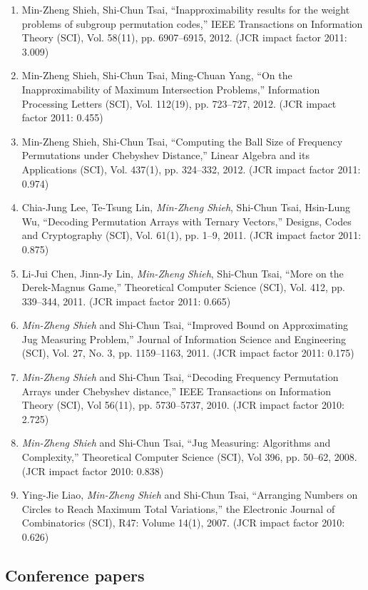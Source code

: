 \documentclass[A4]{article}
\begin{document}
\begin{enumerate}
\item Min-Zheng Shieh, Shi-Chun Tsai, ``Inapproximability results for the weight problems of subgroup permutation codes,'' IEEE Transactions on Information Theory (SCI), Vol. 58(11), pp. 6907--6915, 2012. (JCR impact factor 2011: 3.009)
\item Min-Zheng Shieh, Shi-Chun Tsai, Ming-Chuan Yang, ``On the Inapproximability of Maximum Intersection Problems,'' Information Processing Letters (SCI), Vol. 112(19), pp. 723--727, 2012. (JCR impact factor 2011: 0.455)
\item Min-Zheng Shieh, Shi-Chun Tsai, ``Computing the Ball Size of Frequency Permutations under Chebyshev Distance,'' Linear Algebra and its Applications (SCI), Vol. 437(1), pp. 324--332, 2012. (JCR impact factor 2011: 0.974)
\item Chia-Jung Lee, Te-Tsung Lin, \emph{Min-Zheng Shieh}, Shi-Chun Tsai, Hsin-Lung Wu, ``Decoding Permutation Arrays with Ternary Vectors,'' Designs, Codes and Cryptography (SCI), Vol. 61(1), pp. 1--9, 2011. (JCR impact factor 2011: 0.875)
\item Li-Jui Chen, Jinn-Jy Lin, \emph{Min-Zheng Shieh}, Shi-Chun Tsai,
``More on the Derek-Magnus Game,''  Theoretical Computer Science (SCI), Vol. 412, pp. 339--344, 2011. 
(JCR impact factor 2011: 0.665)
\item \emph{Min-Zheng Shieh} and Shi-Chun Tsai, ``Improved Bound on Approximating Jug Measuring Problem,'' Journal of Information Science and Engineering (SCI), Vol. 27, No. 3, pp. 1159--1163, 2011. 
(JCR impact factor 2011: 0.175)
\item \emph{Min-Zheng Shieh} and Shi-Chun Tsai, ``Decoding Frequency Permutation Arrays under Chebyshev distance,'' IEEE Transactions on Information Theory (SCI), Vol 56(11), pp. 5730--5737, 2010.
(JCR impact factor 2010: 2.725)
\item \emph{Min-Zheng Shieh} and Shi-Chun Tsai, ``Jug Measuring: Algorithms and Complexity,'' Theoretical Computer Science (SCI), Vol 396, pp. 50--62, 2008.
(JCR impact factor 2010: 0.838)
\item Ying-Jie Liao, \emph{Min-Zheng Shieh} and Shi-Chun Tsai, ``Arranging Numbers on Circles to Reach Maximum Total Variations,'' the Electronic Journal of Combinatorics (SCI), R47: Volume 14(1), 2007.
(JCR impact factor 2010: 0.626)
\end{enumerate}

\subsection*{Conference papers}
\end{document}
